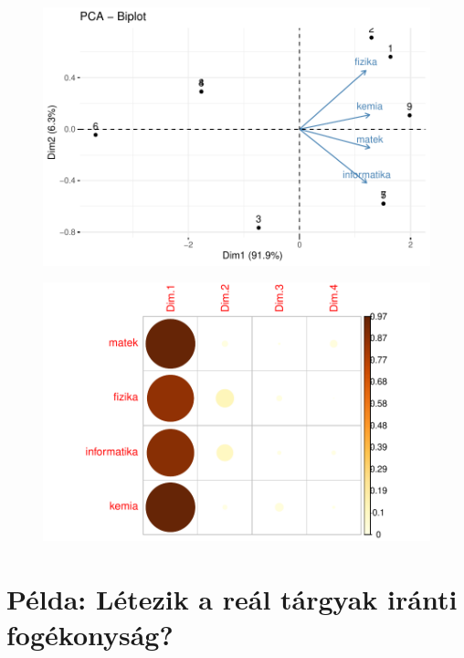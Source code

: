 \documentclass[
  letterpaper,
]{krantz}
\begin{document}
\begin{figure}[H]

{\centering \includegraphics{./sec_fokomponens_elemzes_files/figure-pdf/unnamed-chunk-7-4.pdf}

}

\end{figure}

\begin{figure}[H]

{\centering \includegraphics{./sec_fokomponens_elemzes_files/figure-pdf/unnamed-chunk-7-5.pdf}

}

\end{figure}

\hypertarget{puxe9lda-luxe9tezik-a-reuxe1l-tuxe1rgyak-iruxe1nti-foguxe9konysuxe1g}{%
\section{Példa: Létezik a reál tárgyak iránti
fogékonyság?}\label{puxe9lda-luxe9tezik-a-reuxe1l-tuxe1rgyak-iruxe1nti-foguxe9konysuxe1g}}
\end{document}

